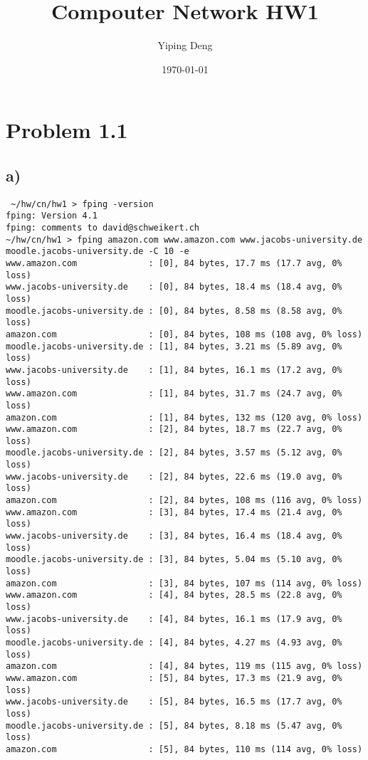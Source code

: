 \documentclass[11pt]{article}
\author{Yiping Deng}
\date{\today}
\title{Compouter Network HW1}
\begin{document}
\maketitle
\tableofcontents

\section{Problem 1.1}
\label{sec:org74f849f}
\subsection{a)}
\label{sec:orgd5588f1}
\begin{verbatim}
 ~/hw/cn/hw1 > fping -version
fping: Version 4.1
fping: comments to david@schweikert.ch
~/hw/cn/hw1 > fping amazon.com www.amazon.com www.jacobs-university.de moodle.jacobs-university.de -C 10 -e
www.amazon.com              : [0], 84 bytes, 17.7 ms (17.7 avg, 0% loss)
www.jacobs-university.de    : [0], 84 bytes, 18.4 ms (18.4 avg, 0% loss)
moodle.jacobs-university.de : [0], 84 bytes, 8.58 ms (8.58 avg, 0% loss)
amazon.com                  : [0], 84 bytes, 108 ms (108 avg, 0% loss)
moodle.jacobs-university.de : [1], 84 bytes, 3.21 ms (5.89 avg, 0% loss)
www.jacobs-university.de    : [1], 84 bytes, 16.1 ms (17.2 avg, 0% loss)
www.amazon.com              : [1], 84 bytes, 31.7 ms (24.7 avg, 0% loss)
amazon.com                  : [1], 84 bytes, 132 ms (120 avg, 0% loss)
www.amazon.com              : [2], 84 bytes, 18.7 ms (22.7 avg, 0% loss)
moodle.jacobs-university.de : [2], 84 bytes, 3.57 ms (5.12 avg, 0% loss)
www.jacobs-university.de    : [2], 84 bytes, 22.6 ms (19.0 avg, 0% loss)
amazon.com                  : [2], 84 bytes, 108 ms (116 avg, 0% loss)
www.amazon.com              : [3], 84 bytes, 17.4 ms (21.4 avg, 0% loss)
www.jacobs-university.de    : [3], 84 bytes, 16.4 ms (18.4 avg, 0% loss)
moodle.jacobs-university.de : [3], 84 bytes, 5.04 ms (5.10 avg, 0% loss)
amazon.com                  : [3], 84 bytes, 107 ms (114 avg, 0% loss)
www.amazon.com              : [4], 84 bytes, 28.5 ms (22.8 avg, 0% loss)
www.jacobs-university.de    : [4], 84 bytes, 16.1 ms (17.9 avg, 0% loss)
moodle.jacobs-university.de : [4], 84 bytes, 4.27 ms (4.93 avg, 0% loss)
amazon.com                  : [4], 84 bytes, 119 ms (115 avg, 0% loss)
www.amazon.com              : [5], 84 bytes, 17.3 ms (21.9 avg, 0% loss)
www.jacobs-university.de    : [5], 84 bytes, 16.5 ms (17.7 avg, 0% loss)
moodle.jacobs-university.de : [5], 84 bytes, 8.18 ms (5.47 avg, 0% loss)
amazon.com                  : [5], 84 bytes, 110 ms (114 avg, 0% loss)

\end{verbatim}
\end{document}
